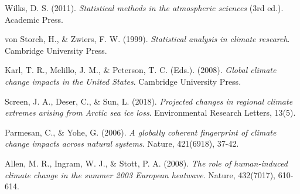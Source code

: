 \documentclass{article}
\begin{document}
\begin{thebibliography}{10}
Wilks, D. S. (2011).
\textit{Statistical methods in the atmospheric sciences} (3rd ed.).
Academic Press.

von Storch, H., \& Zwiers, F. W. (1999).
\textit{Statistical analysis in climate research}.
Cambridge University Press.

Karl, T. R., Melillo, J. M., \& Peterson, T. C. (Eds.). (2008).
\textit{Global climate change impacts in the United States}.
Cambridge University Press.

Screen, J. A., Deser, C., \& Sun, L. (2018).
\textit{Projected changes in regional climate extremes arising from Arctic sea ice loss}.
Environmental Research Letters, 13(5).

Parmesan, C., \& Yohe, G. (2006).
\textit{A globally coherent fingerprint of climate change impacts across natural systems}.
Nature, 421(6918), 37-42.

Allen, M. R., Ingram, W. J., \& Stott, P. A. (2008).
\textit{The role of human-induced climate change in the summer 2003 European heatwave}.
Nature, 432(7017), 610-614.

\end{thebibliography}
\end{document}
